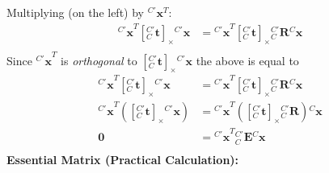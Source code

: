 \documentclass[a4paper,10pt]{article}
\newcommand{\spppnhx}[3]{\ensuremath{{^{#1}_{#2}}\mathbf{{{#3}}}}}
\begin{document}
Multiplying (on the left) by $^{C'}\mathbf{x}^{T}$:
\newline\noindent\newline\noindent
\begin{equation*}
\begin{split}
{{^{C'}\mathbf{x}}^{T}}{[\spppnhx{C'}{C}{t}]_{\times}}{^{C'}\mathbf{x}} &=
{{^{C'}\mathbf{x}}^{T}}{[\spppnhx{C'}{C}{t}]_{\times}}{\spppnhx{C'}{C}{R}}{^{C}\mathbf{x}}\\
\end{split}
\end{equation*}
Since ${^{C'}\mathbf{x}}^{T}$ is \emph{orthogonal} to ${[\spppnhx{C'}{C}{t}]_{\times}}{^{C'}\mathbf{x}}$ the above is equal to
\begin{equation*}
\begin{split}
{{^{C'}\mathbf{x}}^{T}}{[\spppnhx{C'}{C}{t}]_{\times}}{^{C'}\mathbf{x}} &=
{{^{C'}\mathbf{x}}^{T}}{[\spppnhx{C'}{C}{t}]_{\times}}{\spppnhx{C'}{C}{R}}{^{C}\mathbf{x}}\\
{{^{C'}\mathbf{x}}^{T}}\left({[\spppnhx{C'}{C}{t}]_{\times}}{^{C'}\mathbf{x}}\right) &=
{{^{C'}\mathbf{x}}^{T}}\left({[\spppnhx{C'}{C}{t}]_{\times}}{\spppnhx{C'}{C}{R}}\right){^{C}\mathbf{x}}\\
\mathbf{0}&={{^{C'}\mathbf{x}}^{T}}{^{C'}_{C}\mathbf{E}}{^{C}\mathbf{x}}\\
\end{split}
\end{equation*}
\newline\noindent\newline\noindent
\textbf{Essential Matrix (Practical Calculation):}
\newline\noindent
\end{document}
